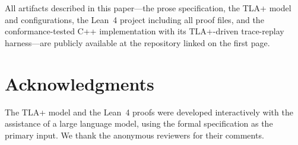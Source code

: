\documentclass[11pt,a4paper]{article}
\begin{document}
All artifacts described in this paper---the prose specification, the
TLA+ model and configurations, the Lean~4 project including all proof
files, and the conformance-tested C++ implementation with its
TLA+-driven trace-replay harness---are publicly available at the
repository linked on the first page.


\section*{Acknowledgments}

The TLA+ model and the Lean~4 proofs were developed interactively with
the assistance of a large language model, using the formal specification
as the primary input. We thank the anonymous reviewers for their
comments.

\end{document}
